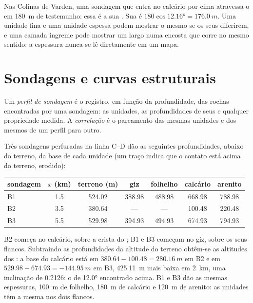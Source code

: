 Nas Colinas de Varden, uma sondagem que entra no calcário por cima atravessa-o em \qty{180}{m} de testemunho: essa é a sua . Sua  é $180\cos\ang{12.16} = \qty{176.0}{m}$. Uma unidade fina e uma unidade espessa podem mostrar o mesmo  se os seus  diferirem, e uma camada íngreme pode mostrar um  largo numa encosta que corre no mesmo sentido: a espessura nunca se lê diretamente em um mapa.

\section{Sondagens e curvas estruturais}\label{sec:b1:cross-sections:boreholes}

\begin{definition}\label{def:b1:cross-sections:log}
Um \emph{perfil de sondagem} é o registro, em função da profundidade, das rochas encontradas por uma sondagem: as unidades, as profundidades de seus  e qualquer propriedade medida. A \emph{correlação} é o pareamento das mesmas unidades e dos mesmos  de um perfil para outro.
\end{definition}

Três sondagens perfuradas na linha C--D dão as seguintes profundidades, abaixo do terreno, da base de cada unidade (um traço indica que o contato está acima do terreno, erodido):
\begin{center}
\small
\begin{tabular}{lcccccc}
\hline
sondagem & $x$ (km) & terreno (m) & giz & folhelho & calcário & arenito \\
\hline
B1 & 1.5 & 524.02 & 388.98 & 488.98 & 668.98 & 788.98 \\
B2 & 3.5 & 380.64 & --- & --- & 100.48 & 220.48 \\
B3 & 5.5 & 529.98 & 394.93 & 494.93 & 674.93 & 794.93 \\
\hline
\end{tabular}
\end{center}
B2 começa no calcário, sobre a crista do ; B1 e B3 começam no giz, sobre os seus flancos. Subtraindo as profundidades da altitude do terreno obtêm-se as altitudes dos : a base do calcário está em
$380.64 - 100.48 = \qty{280.16}{m}$ em B2 e em $529.98 - 674.93 =
\qty{-144.95}{m}$ em B3, \qty{425.11}{m} mais baixa em \qty{2}{km}, uma inclinação de
\num{0.2126}: o  de \ang{12.0} encontrado acima. B1 e B3 dão as mesmas espessuras, \qty{100}{m} de folhelho, \qty{180}{m} de calcário e
\qty{120}{m} de arenito: as unidades têm a mesma  nos dois flancos.

